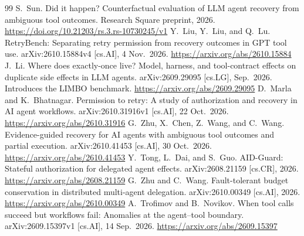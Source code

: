\documentclass[11pt]{article}
\begin{document}
\begin{thebibliography}{99}
 S.~Sun. Did it happen? Counterfactual evaluation of LLM agent recovery from ambiguous tool outcomes. Research Square preprint, 2026. \url{https://doi.org/10.21203/rs.3.rs-10730245/v1}
 Y.~Liu, Y.~Liu, and Q.~Lu. RetryBench: Separating retry permission from recovery outcomes in GPT tool use. arXiv:2610.15884v4 [cs.AI], 4 Nov.\ 2026. \url{https://arxiv.org/abs/2610.15884}
 J.~Li. Where does exactly-once live? Model, harness, and tool-contract effects on duplicate side effects in LLM agents. arXiv:2609.29095 [cs.LG], Sep.\ 2026. Introduces the LIMBO benchmark. \url{https://arxiv.org/abs/2609.29095}
 D.~Marla and K.~Bhatnagar. Permission to retry: A study of authorization and recovery in AI agent workflows. arXiv:2610.31916v1 [cs.AI], 22 Oct.\ 2026. \url{https://arxiv.org/abs/2610.31916}
 G.~Zhu, X.~Chen, Z.~Wang, and C.~Wang. Evidence-guided recovery for AI agents with ambiguous tool outcomes and partial execution. arXiv:2610.41453 [cs.AI], 30 Oct.\ 2026. \url{https://arxiv.org/abs/2610.41453}
 Y.~Tong, L.~Dai, and S.~Guo. AID-Guard: Stateful authorization for delegated agent effects. arXiv:2608.21159 [cs.CR], 2026. \url{https://arxiv.org/abs/2608.21159}
 G.~Zhu and C.~Wang. Fault-tolerant budget conservation in distributed multi-agent delegation. arXiv:2610.00349 [cs.AI], 2026. \url{https://arxiv.org/abs/2610.00349}
 A.~Trofimov and B.~Novikov. When tool calls succeed but workflows fail: Anomalies at the agent--tool boundary. arXiv:2609.15397v1 [cs.AI], 14 Sep.\ 2026. \url{https://arxiv.org/abs/2609.15397}
\end{thebibliography}
\end{document}
